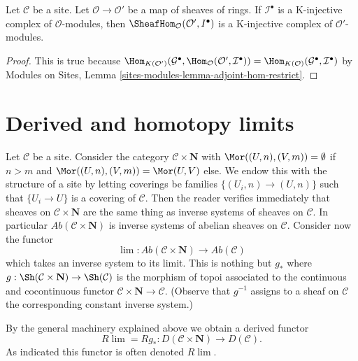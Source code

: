 \begin{lemma}
\label{lemma-hom-K-injective}
Let $\mathcal{C}$ be a site. Let $\mathcal{O} \to \mathcal{O}'$ be a map
of sheaves of rings. If $\mathcal{I}^\bullet$ is a K-injective complex of
$\mathcal{O}$-modules, then $\SheafHom_\mathcal{O}(\mathcal{O}', I^\bullet)$
is a K-injective complex of $\mathcal{O}'$-modules.
\end{lemma}

\begin{proof}
This is true because
$\Hom_{K(\mathcal{O}')}(\mathcal{G}^\bullet,
\Hom_\mathcal{O}(\mathcal{O}', \mathcal{I}^\bullet)) =
\Hom_{K(\mathcal{O})}(\mathcal{G}^\bullet, \mathcal{I}^\bullet)$
by Modules on Sites, Lemma \ref{sites-modules-lemma-adjoint-hom-restrict}.
\end{proof}






\section{Derived and homotopy limits}
\label{section-derived-limits}

\noindent
Let $\mathcal{C}$ be a site. Consider the category
$\mathcal{C} \times \mathbf{N}$ with
$\Mor((U, n), (V, m)) = \emptyset$ if $n > m$ and
$\Mor((U, n), (V, m)) = \Mor(U, V)$ else. We endow this with the
structure of a site by letting coverings
be families $\{(U_i, n) \to (U, n)\}$ such that
$\{U_i \to U\}$ is a covering of $\mathcal{C}$.
Then the reader verifies immediately that
sheaves on $\mathcal{C} \times \mathbf{N}$ are the same thing
as inverse systems of sheaves on $\mathcal{C}$.
In particular $\textit{Ab}(\mathcal{C} \times \mathbf{N})$
is inverse systems of abelian sheaves on $\mathcal{C}$.
Consider now the functor
$$
\lim : \textit{Ab}(\mathcal{C} \times \mathbf{N}) \to \textit{Ab}(\mathcal{C})
$$
which takes an inverse system to its limit. This is nothing but
$g_*$ where $g : \Sh(\mathcal{C} \times \mathbf{N}) \to \Sh(\mathcal{C})$
is the morphism of topoi associated to the continuous and cocontinuous functor
$\mathcal{C} \times \mathbf{N} \to \mathcal{C}$. (Observe that
$g^{-1}$ assigns to a sheaf on $\mathcal{C}$ the corresponding
constant inverse system.)

\medskip\noindent
By the general machinery explained above we obtain a derived functor
$$
R\lim = Rg_* : D(\mathcal{C} \times \mathbf{N}) \to D(\mathcal{C}).
$$
As indicated this functor is often denoted $R\lim$.

